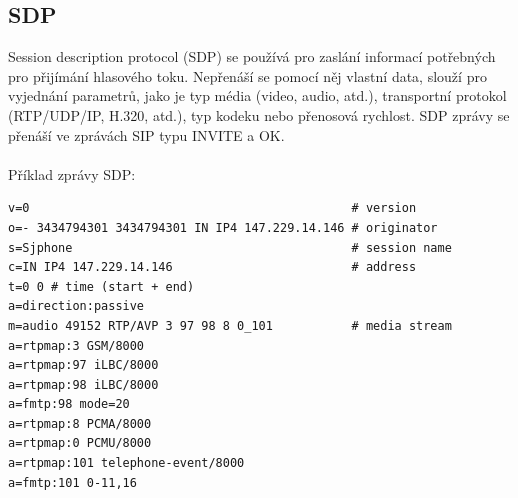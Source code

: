 \subsection*{SDP}
Session description protocol (SDP) se používá pro zaslání informací potřebných pro přijímání hlasového toku.
Nepřenáší se pomocí něj vlastní data, slouží pro vyjednání parametrů, jako je typ média (video, audio, atd.),
transportní protokol (RTP/UDP/IP, H.320, atd.), typ kodeku nebo přenosová rychlost.
SDP zprávy se přenáší ve zprávách SIP typu INVITE a OK. \\
~\\
\noindent Příklad zprávy SDP:
\begin{lstlisting}
v=0                                             # version
o=- 3434794301 3434794301 IN IP4 147.229.14.146 # originator
s=Sjphone                                       # session name
c=IN IP4 147.229.14.146                         # address
t=0 0 # time (start + end)
a=direction:passive
m=audio 49152 RTP/AVP 3 97 98 8 0_101           # media stream
a=rtpmap:3 GSM/8000
a=rtpmap:97 iLBC/8000
a=rtpmap:98 iLBC/8000
a=fmtp:98 mode=20
a=rtpmap:8 PCMA/8000
a=rtpmap:0 PCMU/8000
a=rtpmap:101 telephone-event/8000
a=fmtp:101 0-11,16
\end{lstlisting}
